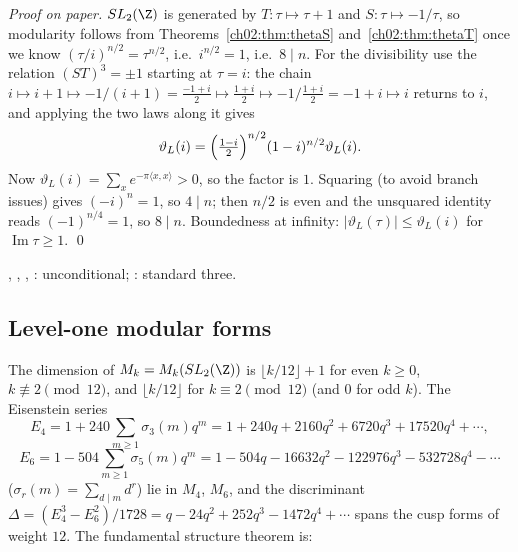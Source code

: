 \emph{Proof on paper.}  $SL_2(\Z)$ is generated by $T:\tau\mapsto\tau+1$ and $S:\tau\mapsto-1/\tau$,
so modularity follows from Theorems~\ref{ch02:thm:thetaS} and~\ref{ch02:thm:thetaT} once we know
$(\tau/i)^{n/2}=\tau^{n/2}$, i.e.\ $i^{n/2}=1$, i.e.\ $8\mid n$.  For the divisibility use the
relation $(ST)^3=\pm1$ starting at $\tau=i$: the chain $i\mapsto i+1\mapsto-1/(i+1)=\tfrac{-1+i}2
\mapsto\tfrac{1+i}2\mapsto-1/\tfrac{1+i}2=-1+i\mapsto i$ returns to $i$, and applying the two
laws along it gives
\begin{equation*}
\vartheta_L(i)=\Bigl(\tfrac{1-i}2\Bigr)^{n/2}(1-i)^{n/2}\vartheta_L(i).
\end{equation*}
Now $\vartheta_L(i)=\sum_xe^{-\pi\langle x,x\rangle}>0$, so the factor is $1$.  Squaring (to avoid
branch issues) gives $(-i)^n=1$, so $4\mid n$; then $n/2$ is even and the unsquared identity reads
$(-1)^{n/4}=1$, so $8\mid n$.  Boundedness at infinity: $|\vartheta_L(\tau)|\le\vartheta_L(i)$ for
$\operatorname{Im}\tau\ge1$. \qed

\begin{status}
, ,
, : unconditional;
: standard three.
\end{status}

\subsection{Level-one modular forms}

The dimension of $M_k=M_k(SL_2(\Z))$ is $\lfloor k/12\rfloor+1$ for even $k\ge0$,
$k\not\equiv2\pmod{12}$, and $\lfloor k/12\rfloor$ for $k\equiv2\pmod{12}$ (and $0$ for odd $k$).
The Eisenstein series
\begin{equation*}
E_4=1+240\sum_{m\ge1}\sigma_3(m)q^m=1+240q+2160q^2+6720q^3+17520q^4+\cdots,
\end{equation*}
\begin{equation*}
E_6=1-504\sum_{m\ge1}\sigma_5(m)q^m=1-504q-16632q^2-122976q^3-532728q^4-\cdots
\end{equation*}
($\sigma_r(m)=\sum_{d\mid m}d^r$) lie in $M_4$, $M_6$, and the discriminant
$\Delta=(E_4^3-E_6^2)/1728=q-24q^2+252q^3-1472q^4+\cdots$ spans the cusp forms of weight $12$.  The
fundamental structure theorem is:

